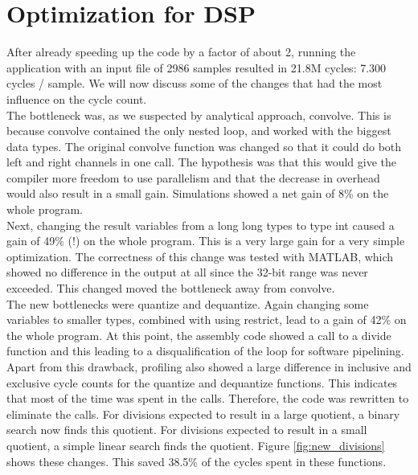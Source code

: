\documentclass[a4paper]{article}
\begin{document}
\section{Optimization for DSP}
After already speeding up the code by a factor of about 2, running the application with an input file of 2986 samples resulted in 21.8M cycles: 7.300 cycles / sample. We will now discuss some of the changes that had the most influence on the cycle count. \\

The bottleneck was, as we suspected by analytical approach, convolve. This is because convolve contained the only nested loop, and worked with the biggest data types. The original convolve function was changed so that it could do both left and right channels in one call. The hypothesis was that this would give the compiler more freedom to use parallelism and that the decrease in overhead would also result in a small gain. Simulations showed a net gain of 8\% on the whole program.\\

Next, changing the result variables from a long long types to type int caused a gain of 49\% (!) on the whole program. This is a very large gain for a very simple optimization. The correctness of this change was tested with MATLAB, which showed no difference in the output at all since the 32-bit range was never exceeded. This changed moved the bottleneck away from convolve.\\

The new bottlenecks were quantize and dequantize. Again changing some variables to smaller types, combined with using restrict, lead to a gain of 42\% on the whole program. At this point, the assembly code showed a call to a divide function and this leading to a disqualification of the loop for software pipelining. Apart from this drawback, profiling also showed a large difference in inclusive and exclusive cycle counts for the quantize and dequantize functions. This indicates that most of the time was spent in the calls. Therefore, the code was rewritten to eliminate the calls. For divisions expected to result in a large quotient, a binary search now finds this quotient. For divisions expected to result in a small quotient, a simple linear search finds the quotient. Figure \ref{fig:new_divisions} shows these changes. This saved 38.5\% of the cycles spent in these functions.\\
\end{document}

